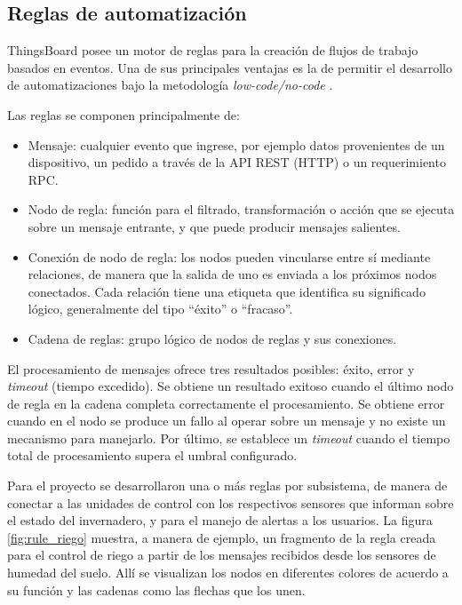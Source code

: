 \subsection{Reglas de automatización}
\label{sec:Reglas de automatización}
 
 
ThingsBoard posee un motor de reglas \citep{TB_Rules} para la creación de flujos de trabajo basados en eventos. Una de sus principales ventajas es la de permitir el desarrollo de automatizaciones bajo la metodología \textit{low-code/no-code} \citep{lcnc}.

Las reglas se componen principalmente de:
 
 \begin{itemize}
 \item Mensaje: cualquier evento que ingrese, por ejemplo datos provenientes de un dispositivo, un pedido a través de la API REST (HTTP) o un requerimiento RPC.
 \item Nodo de regla: función para el filtrado, transformación o acción que se ejecuta sobre un mensaje entrante, y que puede producir mensajes salientes.
\item Conexión de nodo de regla: los nodos pueden vincularse entre sí mediante relaciones, de manera que la salida de uno es enviada a los próximos nodos conectados. Cada relación tiene una etiqueta que identifica su significado lógico, generalmente del tipo ``éxito'' o ``fracaso''.
\item Cadena de reglas: grupo lógico de nodos de reglas y sus conexiones.

 \end{itemize}


El procesamiento de mensajes ofrece tres resultados posibles: éxito, error y \textit{timeout} (tiempo excedido).  Se obtiene un resultado exitoso cuando el último nodo de regla en la cadena completa correctamente el procesamiento. Se obtiene error cuando en el nodo se produce un fallo al operar sobre un mensaje y no existe un mecanismo para manejarlo. Por último, se establece un \textit{timeout} cuando el tiempo total de procesamiento supera el umbral configurado.



Para el proyecto se desarrollaron una o más reglas por subsistema, de manera de conectar a las unidades de control con los respectivos sensores que informan sobre el estado del invernadero, y para el manejo de alertas a los usuarios. La figura \ref{fig:rule_riego} muestra, a manera de ejemplo, un fragmento de la regla creada para el control de riego a partir de los mensajes recibidos desde los sensores de humedad del suelo. Allí se visualizan los nodos en diferentes colores de acuerdo a su función y las cadenas como las flechas que los unen.

